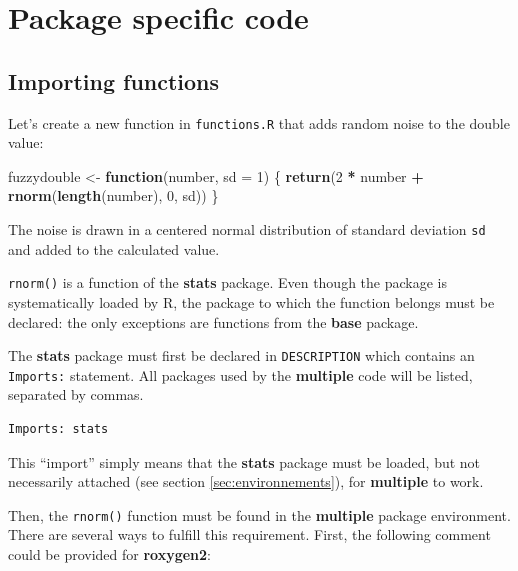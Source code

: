 \documentclass[
  12pt,
  american,
  a4paper,
  extrafontsizes,onecolumn,openright
  ]{memoir}
\newenvironment{Shaded}{\begin{snugshade}}{\end{snugshade}}
\newcommand{\AttributeTok}[1]{\textcolor[rgb]{0.13,0.29,0.53}{#1}}
\newcommand{\ControlFlowTok}[1]{\textcolor[rgb]{0.13,0.29,0.53}{\textbf{#1}}}
\newcommand{\DecValTok}[1]{\textcolor[rgb]{0.00,0.00,0.81}{#1}}
\newcommand{\FunctionTok}[1]{\textcolor[rgb]{0.13,0.29,0.53}{\textbf{#1}}}
\newcommand{\NormalTok}[1]{#1}
\newcommand{\OtherTok}[1]{\textcolor[rgb]{0.56,0.35,0.01}{#1}}
\newcommand{\SpecialCharTok}[1]{\textcolor[rgb]{0.81,0.36,0.00}{\textbf{#1}}}
\begin{document}
\section{Package specific code}\label{package-specific-code}

\subsection{Importing functions}\label{importing-functions}

Let's create a new function in \texttt{functions.R} that adds random noise to the double value:

\scriptsize

\begin{Shaded}
\begin{Highlighting}[]
\NormalTok{fuzzydouble }\OtherTok{\textless{}{-}} \ControlFlowTok{function}\NormalTok{(number, }\AttributeTok{sd =} \DecValTok{1}\NormalTok{) \{}
  \FunctionTok{return}\NormalTok{(}\DecValTok{2} \SpecialCharTok{*}\NormalTok{ number }\SpecialCharTok{+} \FunctionTok{rnorm}\NormalTok{(}\FunctionTok{length}\NormalTok{(number), }\DecValTok{0}\NormalTok{, sd))}
\NormalTok{\}}
\end{Highlighting}
\end{Shaded}

\normalsize
The noise is drawn in a centered normal distribution of standard deviation \texttt{sd} and added to the calculated value.

\texttt{rnorm()} is a function of the \textbf{stats} package.
Even though the package is systematically loaded by R, the package to which the function belongs must be declared: the only exceptions are functions from the \textbf{base} package.

The \textbf{stats} package must first be declared in \texttt{DESCRIPTION} which contains an \texttt{Imports:} statement.
All packages used by the \textbf{multiple} code will be listed, separated by commas.

\begin{verbatim}
Imports: stats
\end{verbatim}

This \enquote{import} simply means that the \textbf{stats} package must be loaded, but not necessarily attached (see section \ref{sec:environnements}), for \textbf{multiple} to work.

Then, the \texttt{rnorm()} function must be found in the \textbf{multiple} package environment.
There are several ways to fulfill this requirement.
First, the following comment could be provided for \textbf{roxygen2}:
\end{document}
